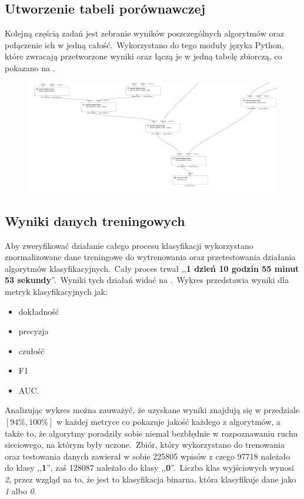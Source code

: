 \subsection{Utworzenie tabeli porównawczej}
Kolejną częścią zadań jest zebranie wyników poszczególnych algorytmów oraz połączenie ich w jedną całość.\ Wykorzystano do tego moduły języka Python, które zwracają przetworzone wyniki oraz łączą je w jedną tabelę zbiorczą, co pokazano na .

\begin{figure}[H]
    \centering
    \includegraphics[width=\textwidth]{images/pipe-csv}
    \label{fig:pipe-4}
\end{figure}

\subsection{Wyniki danych treningowych}
Aby zweryfikować działanie całego procesu klasyfikacji wykorzystano znormalizowane dane treningowe do wytrenowania oraz przetestowania działania algorytmów klasyfikacyjnych.\ Cały proces trwał ,,\textbf{1 dzień 10 godzin 55 minut 53 sekundy}''.\ Wyniki tych działań widać na .\ Wykres przedstawia wyniki dla metryk klasyfikacyjnych jak:
\begin{itemize}
    \item dokładność
    \item precyzja
    \item czułość
    \item F1
    \item AUC.
\end{itemize}


Analizując wykres można zauważyć, że uzyskane wyniki znajdują się w przedziale $[94\%, 100\%]$ w każdej metryce co pokazuje jakość każdego z algorytmów, a także to, że algorytmy poradziły sobie niemal bezbłędnie w rozpoznawaniu ruchu sieciowego, na którym były uczone.\ Zbiór, który wykorzystano do trenowania oraz testowania danych zawierał w sobie 225805 wpisów z czego 97718 należało do klasy ,,\textbf{1}'', zaś 128087 należało do klasy ,,\textbf{0}''.\ Liczba klas wyjściowych wynosi \textit{2}, przez wzgląd na to, że jest to klasyfikacja binarna, która klasyfikuje dane jako \textit{1} albo \textit{0}.

